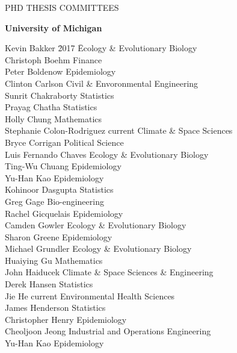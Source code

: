 \begin{mylist}{PHD THESIS COMMITTEES}

\item {\bf University of Michigan}
\begin{tabbing}
Kevin Bakker \hspace{2.5cm} \= 2017 \hspace{1cm} \= Ecology \& Evolutionary Biology\\
Christoph Boehm   \> Finance\\
Peter Boldenow  \> Epidemiology\\
Clinton Carlson  \> Civil \& Envoronmental Engineering\\
Sunrit Chakraborty  \> Statistics\\
Prayag Chatha  \> Statistics\\
Holly Chung  \> Mathematics\\
Stephanie Colon-Rodriguez \>current \> Climate \& Space Sciences\\
Bryce Corrigan  \> Political Science\\
Luis Fernando Chaves  \> Ecology \& Evolutionary Biology\\
Ting-Wu Chuang  \> Epidemiology\\
Yu-Han Kao  \> Epidemiology\\
Kohinoor Dasgupta  \> Statistics \\
Greg Gage  \> Bio-engineering\\ 
Rachel Gicquelais  \> Epidemiology\\
Camden Gowler  \> Ecology \& Evolutionary Biology\\
Sharon Greene  \> Epidemiology\\
Michael Grundler  \> Ecology \& Evolutionary Biology\\
Huaiying Gu  \> Mathematics\\
John Haiducek \> Climate \& Space Sciences \& Engineering\\
Derek Hansen \> Statistics\\
Jie He \> current \> Environmental Health Sciences\\
James Henderson  \> Statistics\\
Christopher Henry  \> Epidemiology\\
Cheoljoon Jeong  \> Industrial and Operations Engineering\\
Yu-Han Kao  \> Epidemiology\\

\end{tabbing}
\end{mylist}
